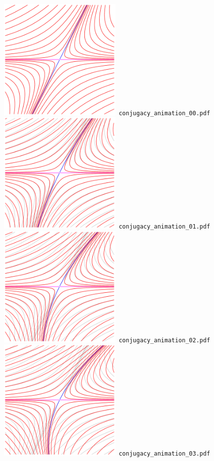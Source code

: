 \documentclass[a4paper]{amsart}
\begin{document}
\includegraphics[width=6cm]{conjugacy_animation_00.pdf}\verb+ conjugacy_animation_00.pdf+\\
\includegraphics[width=6cm]{conjugacy_animation_01.pdf}\verb+ conjugacy_animation_01.pdf+\\
\includegraphics[width=6cm]{conjugacy_animation_02.pdf}\verb+ conjugacy_animation_02.pdf+\\
\includegraphics[width=6cm]{conjugacy_animation_03.pdf}\verb+ conjugacy_animation_03.pdf+\\
\end{document}
